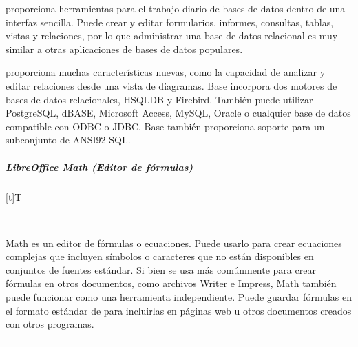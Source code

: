 \documentclass[letterpaper,10pt,spanish]{sphinxmanual}
\let\sphinxpxdimen\pdfpxdimen\else\newdimen\sphinxpxdimen
\begin{document}
\sphinxAtStartPar
{} proporciona herramientas para el trabajo diario de bases de datos dentro de una interfaz sencilla. Puede crear y editar formularios, informes, consultas, tablas, vistas y relaciones, por lo que administrar una base de datos relacional es muy similar a otras aplicaciones de bases de datos populares.

\sphinxAtStartPar
{} proporciona muchas características nuevas, como la capacidad de analizar y editar relaciones desde una vista de diagramas. Base incorpora dos motores de bases de datos relacionales, HSQLDB y Firebird. También puede utilizar PostgreSQL, dBASE, Microsoft Access, MySQL, Oracle o cualquier base de datos compatible con ODBC o JDBC. Base también proporciona soporte para un subconjunto de ANSI\sphinxhyphen{}92 SQL.


\subparagraph{LibreOffice Math (Editor de fórmulas)}
\label{\detokenize{cursos/ofimatica10/recursos/T03:libreoffice-math-editor-de-formulas}}

\begin{savenotes}\sphinxattablestart
\sphinxthistablewithglobalstyle
\centering
\begin{tabulary}{\linewidth}[t]{T}
\sphinxtoprule
\sphinxtableatstartofbodyhook

\begin{sphinxfigure-in-table}
\centering
\capstart
\noindent\sphinxincludegraphics[width=240\sphinxpxdimen]{{image21}.png}
\label{\detokenize{cursos/ofimatica10/recursos/T03:id13}}\end{sphinxfigure-in-table}\relax
\\
\sphinxbottomrule
\end{tabulary}
\sphinxtableafterendhook\par
\sphinxattableend\end{savenotes}

\sphinxAtStartPar
Math es un editor de fórmulas o ecuaciones. Puede usarlo para crear ecuaciones complejas que incluyen símbolos o caracteres que no están disponibles en conjuntos de fuentes estándar. Si bien se usa más comúnmente para crear fórmulas en otros documentos, como archivos Writer e Impress, Math también puede funcionar como una herramienta independiente. Puede guardar fórmulas en el formato estándar de  para incluirlas en páginas web u otros documentos creados con otros programas.


\bigskip\hrule\bigskip
\end{document}
